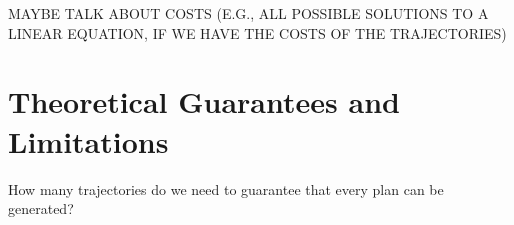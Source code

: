 \documentclass[letterpaper]{article}
\begin{document}
MAYBE TALK ABOUT COSTS (E.G., ALL POSSIBLE SOLUTIONS TO A LINEAR EQUATION, IF WE HAVE THE COSTS OF THE TRAJECTORIES)




\section{Theoretical Guarantees and Limitations}



How many trajectories do we need to guarantee that every plan can be generated?
\end{document}
